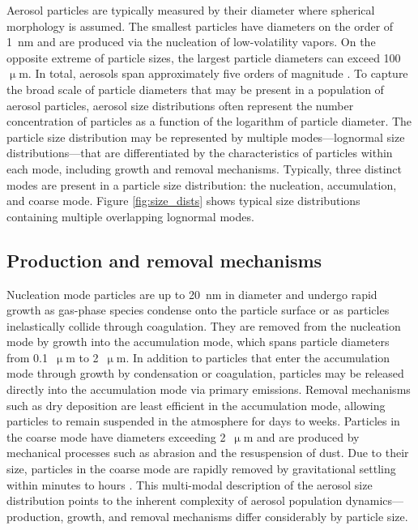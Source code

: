Aerosol particles are typically measured by their diameter where spherical morphology is assumed. The smallest particles have diameters on the order of 1~nm and are produced via the nucleation of low-volatility vapors. On the opposite extreme of particle sizes, the largest particle diameters can exceed 100~$\upmu$m. In total, aerosols span approximately five orders of magnitude \parencite{seinfeld_atmospheric_1998}. To capture the broad scale of particle diameters that may be present in a population of aerosol particles, aerosol size distributions often represent the number concentration of particles as a function of the logarithm of particle diameter. The particle size distribution may be represented by multiple modes---lognormal size distributions---that are differentiated by the characteristics of particles within each mode, including growth and removal mechanisms. Typically, three distinct modes are present in a particle size distribution: the nucleation, accumulation, and coarse mode. Figure \ref{fig:size_dists} shows typical size distributions containing multiple overlapping lognormal modes. 

\subsection{Production and removal mechanisms}
Nucleation mode particles are up to 20~nm in diameter and undergo rapid growth as gas-phase species condense onto the particle surface or as particles inelastically collide through coagulation. They are removed from the nucleation mode by growth into the accumulation mode, which spans particle diameters from 0.1~$\upmu$m to 2~$\upmu$m. In addition to particles that enter the accumulation mode through growth by condensation or coagulation, particles may be released directly into the accumulation mode via primary emissions. Removal mechanisms such as dry deposition are least efficient in the accumulation mode, allowing particles to remain suspended in the atmosphere for days to weeks. Particles in the coarse mode have diameters exceeding 2~$\upmu$m  and are produced by mechanical processes such as abrasion and the resuspension of dust. Due to their size, particles in the coarse mode are rapidly removed by gravitational settling within minutes to hours \parencite{seinfeld_atmospheric_1998}. This multi-modal description of the aerosol size distribution points to the inherent complexity of aerosol population dynamics---production, growth, and removal mechanisms differ considerably by particle size. 

